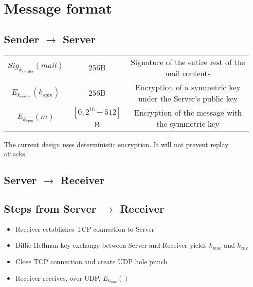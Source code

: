 \documentclass[11pt]{article}
\begin{document}

\section*{Message format}
\subsection*{Sender $\rightarrow$ Server}
\begin{tabular}{c c c}
  $Sig_{k_{sender}}\left(mail\right)$ & $256$B &
    Signature of the entire rest of the mail contents\\
  $E_{k_{server}}\left(k_{sym}\right)$ & $256$B &
    Encryption of a symmetric key under the Server's public key\\
  $E_{k_{sym}}\left(m\right)$ & $\left[0, 2^{16} - 512 \right]$B &
    Encryption of the message with the symmetric key
\end{tabular}
The current design uses deterministic encryption. It will not prevent replay
attacks.

\subsection*{Server $\rightarrow$ Receiver}

\subsection*{Steps from Server $\rightarrow$ Receiver}
\begin{itemize}
  \item Receiver establishes TCP connection to Server
  \item Diffie-Hellman key exchange between Server and Receiver yields
  $k_{mac}$ and $k_{enc}$
  \item Close TCP connection and create UDP hole punch
  \item Receiver receives, over UDP, $E_{k_{mac}}\left(\right)$

\end{itemize}
\end{document}
